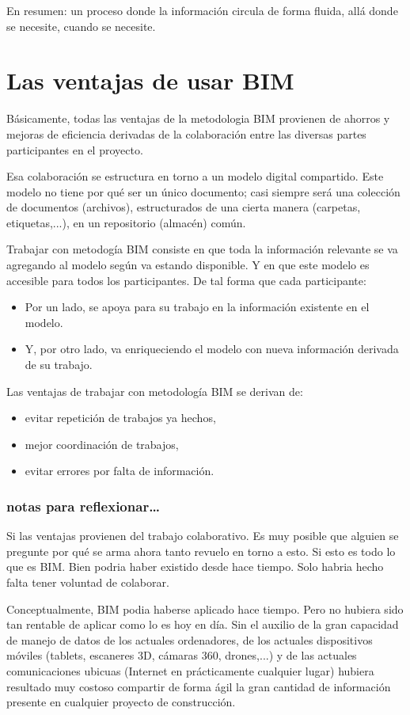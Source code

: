 \documentclass[spanish,12pt,a4paper,final,oneside]{book}
\begin{document}
En resumen: un proceso donde la información circula de forma fluida, allá donde se necesite, cuando se necesite.



\section{Las ventajas de usar BIM}
Básicamente, todas las ventajas de la metodologia BIM provienen de ahorros y mejoras de eficiencia derivadas de la colaboración entre las diversas partes participantes en el proyecto.

Esa colaboración se estructura en torno a un modelo digital compartido. Este modelo no tiene por qué ser un único documento; casi siempre será una colección de documentos (archivos), estructurados de una cierta manera (carpetas, etiquetas,...), en un repositorio (almacén) común.

Trabajar con metodogía BIM consiste en que toda la información relevante se va agregando al modelo según va estando disponible. Y en que este modelo es accesible para todos los participantes. De tal forma que cada participante:
\begin{itemize}
\item Por un lado, se apoya para su trabajo en la información existente en el modelo.
\item Y, por otro lado, va enriqueciendo el modelo con nueva información derivada de su trabajo.
\end{itemize}
Las ventajas de trabajar con metodología BIM se derivan de:
\begin{itemize}
\item evitar repetición de trabajos ya hechos,
\item mejor coordinación de trabajos, 
\item evitar errores por falta de información.
\end{itemize}

\subsubsection{notas para reflexionar\ldots}
Si las ventajas provienen del trabajo colaborativo. Es muy posible que alguien se pregunte por qué se arma ahora tanto revuelo en torno a esto. Si esto es todo lo que es BIM. Bien podria haber existido desde hace tiempo. Solo habria hecho falta tener voluntad de colaborar.

Conceptualmente, BIM podia haberse aplicado hace tiempo. Pero no hubiera sido tan rentable de aplicar como lo es hoy en día. Sin el auxilio de la gran capacidad de manejo de datos de los actuales ordenadores, de los actuales dispositivos móviles (tablets, escaneres 3D, cámaras 360, drones,...) y de las actuales comunicaciones ubicuas (Internet en prácticamente cualquier lugar) hubiera resultado muy costoso compartir de forma ágil la gran cantidad de información presente en cualquier proyecto de construcción. 
\end{document}
